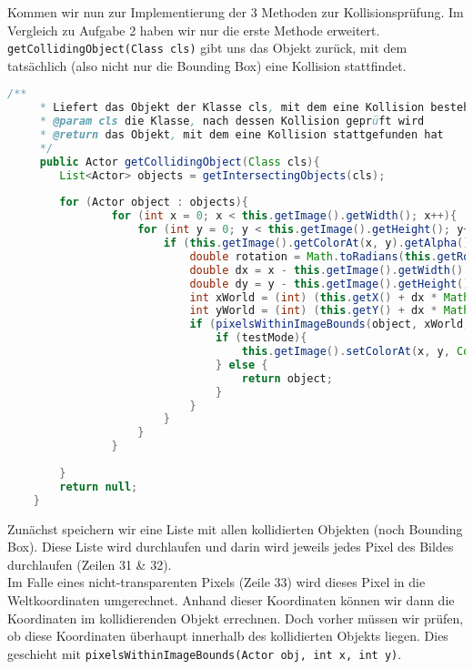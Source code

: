 \documentclass{pi1}
\begin{document}
Kommen wir nun zur Implementierung der 3 Methoden zur Kollisionsprüfung.
Im Vergleich zu Aufgabe 2 haben wir nur die erste Methode erweitert.\\
\texttt{getCollidingObject(Class cls)} gibt uns das Objekt zurück, mit dem tatsächlich (also nicht nur die Bounding Box) eine Kollision stattfindet.

\begin{lstlisting}[caption={\emph{getCollidingObject(Class cls)}-Methode}, firstnumber=22, language=Java]
/**
     * Liefert das Objekt der Klasse cls, mit dem eine Kollision besteht.
     * @param cls die Klasse, nach dessen Kollision geprüft wird
     * @return das Objekt, mit dem eine Kollision stattgefunden hat
     */
     public Actor getCollidingObject(Class cls){
        List<Actor> objects = getIntersectingObjects(cls);
        
        for (Actor object : objects){
                for (int x = 0; x < this.getImage().getWidth(); x++){
                    for (int y = 0; y < this.getImage().getHeight(); y++){
                        if (this.getImage().getColorAt(x, y).getAlpha() > 0){
                            double rotation = Math.toRadians(this.getRotation());
                            double dx = x - this.getImage().getWidth() / 2;
                            double dy = y - this.getImage().getHeight() / 2;
                            int xWorld = (int) (this.getX() + dx * Math.cos(rotation) - dy * Math.sin(rotation));
                            int yWorld = (int) (this.getY() + dx * Math.sin(rotation) + dy * Math.cos(rotation));
                            if (pixelsWithinImageBounds(object, xWorld, yWorld) && visiblePixelAt(xWorld, yWorld, object)){
                                if (testMode){
                                    this.getImage().setColorAt(x, y, Color.RED);
                                } else {
                                    return object;
                                }
                            }                            
                        }
                    }
                }
            
        }
        return null;
    }
\end{lstlisting}

Zunächst speichern wir eine Liste mit allen kollidierten Objekten (noch Bounding Box). Diese Liste wird durchlaufen und darin wird jeweils jedes Pixel des Bildes durchlaufen (Zeilen 31 \& 32).\\
Im Falle eines nicht-transparenten Pixels (Zeile 33) wird dieses Pixel in die Weltkoordinaten umgerechnet. Anhand dieser Koordinaten können wir dann die Koordinaten im kollidierenden Objekt errechnen. Doch vorher müssen wir prüfen, ob diese Koordinaten überhaupt innerhalb des kollidierten Objekts liegen. Dies geschieht mit \texttt{pixelsWithinImageBounds(Actor obj, int x, int y)}.
\end{document}
